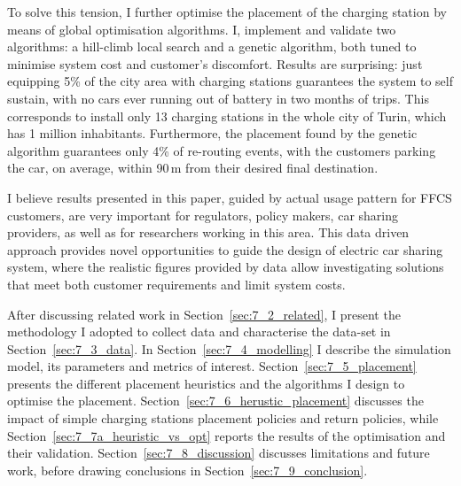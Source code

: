 To solve this tension, I further optimise the placement of the charging station by means of global optimisation algorithms. I, 
implement and validate two algorithms: a hill-climb local search and a genetic algorithm, both tuned to minimise system cost and customer's discomfort. 
Results are surprising: just equipping 5\% of the city area with charging stations guarantees the system to self sustain, with no cars ever running out of battery in two months of trips.
This corresponds to install only 13 charging stations in the whole city of Turin, which has 1 million inhabitants. 
Furthermore, the placement found by the genetic algorithm guarantees only 4\% of re-routing events, with the customers parking the car, on average, within 90\,m from their desired final destination.

I believe results presented in this paper, guided by actual usage pattern for FFCS customers, are very important for regulators, policy makers, car sharing providers, as well as for researchers working in this area. This data driven approach provides novel opportunities to guide the design of electric car sharing system, where the realistic figures provided by data allow investigating solutions that  meet both customer requirements and limit system costs. 

After discussing related work in Section~\ref{sec:7_2_related}, I present the methodology I adopted to collect data and characterise the data-set in Section~\ref{sec:7_3_data}.
 In  Section~\ref{sec:7_4_modelling} I describe the simulation model, its parameters and metrics of interest. Section~\ref{sec:7_5_placement} presents the different placement heuristics and the algorithms I design to optimise the placement.  Section~\ref{sec:7_6_herustic_placement} discusses the impact of simple charging stations placement policies and return policies, while Section~\ref{sec:7_7a_heuristic_vs_opt} reports the results of the optimisation and their validation. Section~\ref{sec:7_8_discussion} discusses limitations and future work, before drawing conclusions in Section~\ref{sec:7_9_conclusion}.
